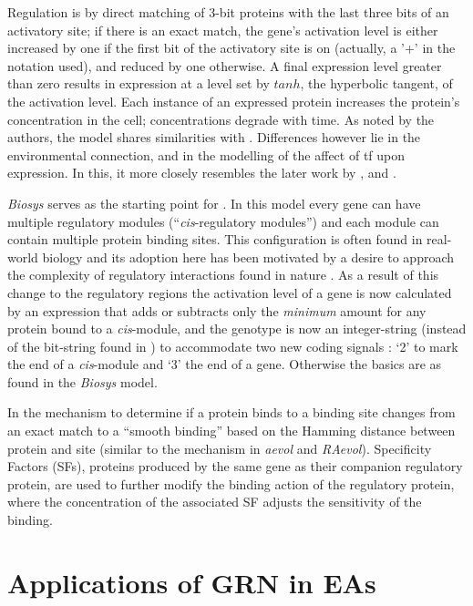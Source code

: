 Regulation is by direct matching of 3-bit proteins with the last three bits of an activatory site; if there is an exact
match, the gene's activation level is either increased by one if the first bit of the activatory site is on (actually, a
'+' in the notation used), and reduced by one otherwise. A final expression level greater than zero results in
expression at a level set by $tanh$, the hyperbolic tangent, of the activation level. Each instance of an expressed
protein increases the protein's concentration in the cell; concentrations degrade with time. As noted by the authors,
the model shares similarities with \cite{Reil:1999rp} \parencite[sec. 2.2]{Quick:2003uq}. Differences however lie in
the environmental connection, and in the modelling of the affect of \gls{tf} upon expression. In this, it more closely
resembles the later work by  \cite{Rohlf:2009sh}, \cite{Banzhaf:2003kx} and \cite{Kuo:2006fv}.

\emph{Biosys} serves as the starting point for \cite{Knabe:2006vn}. In this model every gene can have multiple regulatory modules (``\emph{cis}-regulatory modules'') and each module can contain multiple protein binding sites. This configuration is often found in real-world biology and its adoption here has been motivated by a desire to approach the complexity of regulatory interactions found in nature \parencite[pg.16]{Knabe:2006vn}. As a result of this change to the regulatory regions the activation level of a gene is now calculated by an expression that adds or subtracts only the \emph{minimum} amount for any protein bound to a \emph{cis}-module, and the genotype is now an integer-string (instead of the bit-string found in \cite{Quick:2003uq}) to accommodate two new coding signals : `2' to mark the end of a \emph{cis}-module and `3' the end of a gene. Otherwise the basics are as found in the \emph{Biosys} model.

In \cite{Knabe:2008xe} the mechanism to determine if a protein binds to a binding site
changes from an exact match to a ``smooth binding'' based on the Hamming distance between protein and site (similar to
the mechanism in \emph{aevol} and \emph{RAevol}). Specificity Factors (SFs), proteins produced by the same gene as their
companion regulatory protein, are used to further modify the binding action of the regulatory protein, where the
concentration of the associated SF adjusts the sensitivity of the binding.

\chapter{Applications of GRN in EAs}\label{applications-of-grn-in-eas}

